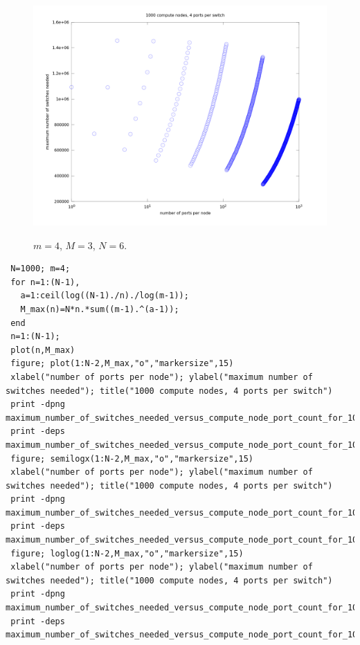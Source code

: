 \documentclass[pdftex]{article}
\begin{document}
\begin{figure}[h!]
\begin{center}
\includegraphics[scale=.3]{pictures/maximum_number_of_switches_needed_versus_compute_node_port_count_for_1000_compute_nodes_and_4_ports_per_switch_semilogx}
\label{fig:max}
 \caption{$m=4$, $M=3$, $N=6$.}
\end{center}
\end{figure}
\begin{verbatim}
 N=1000; m=4; 
 for n=1:(N-1),
   a=1:ceil(log((N-1)./n)./log(m-1));
   M_max(n)=N*n.*sum((m-1).^(a-1));
 end
 n=1:(N-1);
 plot(n,M_max)
 figure; plot(1:N-2,M_max,"o","markersize",15)
 xlabel("number of ports per node"); ylabel("maximum number of switches needed"); title("1000 compute nodes, 4 ports per switch")
 print -dpng maximum_number_of_switches_needed_versus_compute_node_port_count_for_1000_compute_nodes_and_4_ports_per_switch.png
 print -deps maximum_number_of_switches_needed_versus_compute_node_port_count_for_1000_compute_nodes_and_4_ports_per_switch.eps
 figure; semilogx(1:N-2,M_max,"o","markersize",15)
 xlabel("number of ports per node"); ylabel("maximum number of switches needed"); title("1000 compute nodes, 4 ports per switch")
 print -dpng maximum_number_of_switches_needed_versus_compute_node_port_count_for_1000_compute_nodes_and_4_ports_per_switch_semilogx.png
 print -deps maximum_number_of_switches_needed_versus_compute_node_port_count_for_1000_compute_nodes_and_4_ports_per_switch_semilogx.eps
 figure; loglog(1:N-2,M_max,"o","markersize",15)
 xlabel("number of ports per node"); ylabel("maximum number of switches needed"); title("1000 compute nodes, 4 ports per switch")
 print -dpng maximum_number_of_switches_needed_versus_compute_node_port_count_for_1000_compute_nodes_and_4_ports_per_switch_loglog.png
 print -deps maximum_number_of_switches_needed_versus_compute_node_port_count_for_1000_compute_nodes_and_4_ports_per_switch_loglog.eps
\end{verbatim}
 
\end{document}
